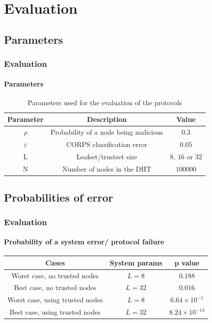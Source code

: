 \section{Evaluation}
\subsection{Parameters}
\begin{frame}
\frametitle{Evaluation}
\framesubtitle{Parameters}
  \begin{table}
    \centering
    \footnotesize
    \begin{tabular}{|ccc|}
      \hline
      \textbf{Parameter} & \textbf{Description} & \textbf{Value} \\
      \hline
      $\rho$ &  Probability of a node being malicious  & $0.3$  \\
      $\varepsilon$& CORPS classification error   & $0.05$ \\
      L &  Leafset/trustset size & $8$, $16$ or $32$  \\
      N &  Number of nodes in the DHT & $100000$  \\
      \hline
    \end{tabular}
    \caption{Parameters used for the evaluation of the protocols}
    \label{tab:variables_used}
  \end{table}
\end{frame}


\subsection{Probabilities of error}
\begin{frame}
\frametitle{Evaluation}
\framesubtitle{Probability of a system error/ protocol failure}
  \begin{table}
    \centering
    \footnotesize
    \begin{tabular}{|ccc|}
      \hline
      \textbf{Cases} & \textbf{System params} & \textbf{p value} \\
      \hline
      Worst case, no trusted nodes &  $L=8$  & $0.188$  \\
      Best case, no trusted nodes &  $L=32$  & $0.016$ \\
      Worst case, using trusted nodes &  $L=8$  & $6.64 \times 10^{-5}$ \\
      Best case, using trusted nodes &  $L=32$  & $8.24 \times 10^{-14}$\\
      \hline
    \end{tabular}
  \end{table}
\end{frame}



